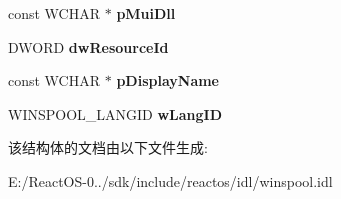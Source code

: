\begin{DoxyCompactItemize}
\item 
\mbox{\label{struct___w_i_n_s_p_o_o_l___f_o_r_m___i_n_f_o__2_a28ecba00b470296d7a2462f71a560df0}} 
const W\+C\+H\+AR $\ast$ {\bfseries p\+Mui\+Dll}
\item 
\mbox{\label{struct___w_i_n_s_p_o_o_l___f_o_r_m___i_n_f_o__2_a8ce26c6395da4d6c63127e1bcaa93d7c}} 
D\+W\+O\+RD {\bfseries dw\+Resource\+Id}
\item 
\mbox{\label{struct___w_i_n_s_p_o_o_l___f_o_r_m___i_n_f_o__2_a0072ec6b57e7ee928445f7965d135390}} 
const W\+C\+H\+AR $\ast$ {\bfseries p\+Display\+Name}
\item 
\mbox{\label{struct___w_i_n_s_p_o_o_l___f_o_r_m___i_n_f_o__2_a6c6b7424761c57ecfb1805dd0cfc5b8d}} 
W\+I\+N\+S\+P\+O\+O\+L\+\_\+\+L\+A\+N\+G\+ID {\bfseries w\+Lang\+ID}
\end{DoxyCompactItemize}


该结构体的文档由以下文件生成\+:\begin{DoxyCompactItemize}
\item 
E\+:/\+React\+O\+S-\/0../sdk/include/reactos/idl/winspool.\+idl\end{DoxyCompactItemize}
